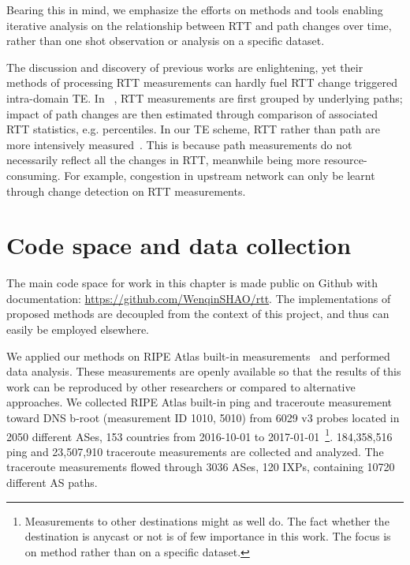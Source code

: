Bearing this in mind, we emphasize the efforts on methods and tools enabling iterative
analysis on the relationship between RTT and path changes over time, rather than one shot observation or analysis on a specific dataset.

The discussion and discovery of previous works are enlightening, yet their methods of processing RTT measurements can hardly fuel RTT change triggered intra-domain TE.
In ~\cite{Pucha2007, Schwartz2010, Chandrasekaran},
RTT measurements are first grouped by underlying paths; impact of path changes are then estimated through comparison of associated RTT statistics, e.g. percentiles.
In our TE scheme, RTT rather than path are more intensively measured~\cite{shao2016}.
This is because path measurements do not necessarily reflect all the changes in RTT, meanwhile being more resource-consuming.
For example, congestion in upstream network can only be learnt through change detection on RTT measurements.

\section{Code space and data collection}
\label{sec:cpt_data}
The main code space for work in this chapter is made public on Github with documentation: \url{https://github.com/WenqinSHAO/rtt}.
The implementations of proposed methods are decoupled from the context of this project, and thus can easily be employed elsewhere.  

We applied our methods on RIPE Atlas built-in measurements~\cite{atlas} and performed data analysis.
These measurements are openly available so that the results of this work can be reproduced by other researchers or compared to alternative approaches.
We collected RIPE Atlas built-in ping and traceroute measurement toward DNS b-root (measurement ID 1010, 5010) from 6029 v3 probes located in 2050 different ASes, 153 countries from 2016-10-01 to 2017-01-01~\footnote{Measurements to other destinations might as well do. The fact whether the destination is anycast or not is of few importance in this work. The focus is on method rather than on a specific dataset.}.
184,358,516 ping and 23,507,910 traceroute measurements are collected and analyzed.
The traceroute measurements flowed through 3036 ASes, 120 IXPs, containing 10720 different AS paths.



